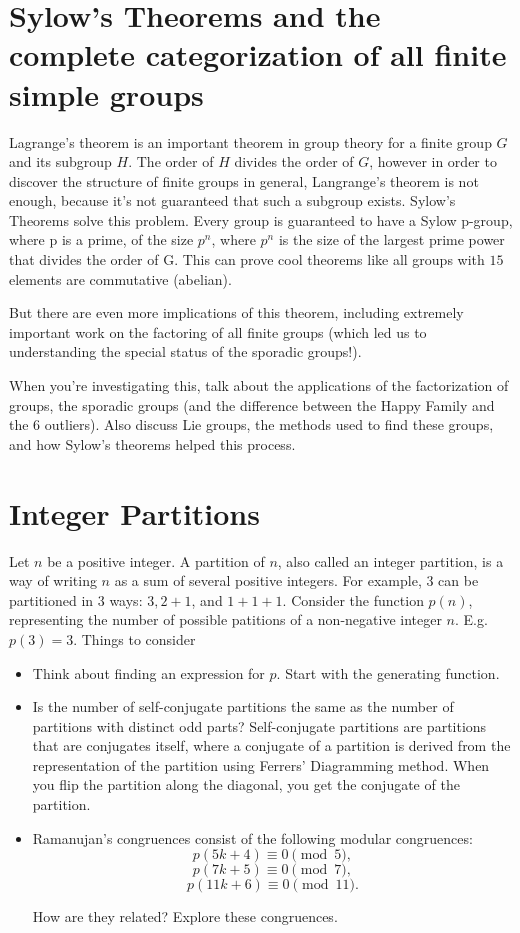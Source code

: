 \documentclass{article}
\begin{document}
\pagebreak

\section{Sylow's Theorems and the complete categorization of all finite simple groups}
    
    Lagrange's theorem is an important theorem in group theory for a finite group $G$ and its subgroup $H$. The order of $H$ divides the order of $G$, however in order to discover the structure of finite groups in general, Langrange's theorem is not enough, because it's not guaranteed that such a subgroup exists. Sylow's Theorems solve this problem. Every group is guaranteed to have a Sylow p-group, where p is a prime, of the size $p^n$, where $p^n$ is the size of the largest prime power that divides the order of G. This can prove cool theorems like all groups with $15$ elements are commutative (abelian).
    
    But there are even more implications of this theorem, including extremely important work on the factoring of all finite groups (which led us to understanding the special status of the sporadic groups!).

    When you're investigating this, talk about the applications of the factorization of groups, the sporadic groups (and the difference between the Happy Family and the 6 outliers).
    Also discuss Lie groups, the methods used to find these groups, and how Sylow's theorems helped this process.

\pagebreak

\section{Integer Partitions}

    Let $n$ be a positive integer. A partition of $n$, also called an integer partition, is a way of writing $n$ as a sum of several positive integers. For example, $3$ can be partitioned in 3 ways: $3, 2 + 1$, and $1 + 1 + 1.$ Consider the function $p(n)$, representing the number of possible patitions of a non-negative integer $n$. E.g. $p(3) = 3.$ Things to consider
    \begin{itemize}
        \item Think about finding an expression for $p$. Start with the generating function.
        \item Is the number of self-conjugate partitions the same as the number of partitions with distinct odd parts? Self-conjugate partitions are partitions that are conjugates itself, where a conjugate of a partition is derived from the representation of the partition using Ferrers' Diagramming method. When you flip the partition along the diagonal, you get the conjugate of the partition.
        \item Ramanujan's congruences consist of the following modular congruences:
        $$p(5k + 4) \equiv 0 \pmod{5},$$
        $$p(7k + 5) \equiv 0\pmod{7},$$
        $$p(11k + 6) \equiv 0 \pmod{11}.$$

        How are they related? Explore these congruences.
    \end{itemize}
\end{document}
